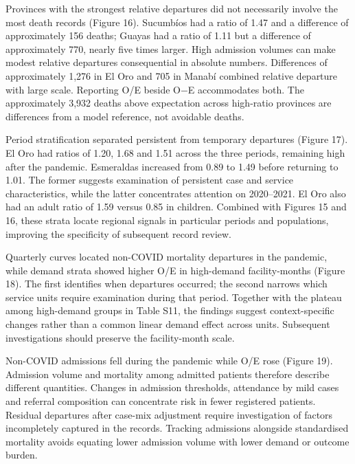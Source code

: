 \documentclass[11pt,a4paper]{article}
\newcommand{\subheading}[1]{\par\needspace{3\baselineskip}\vspace{5pt}{\bfseries #1}\par\vspace{1pt}}
\begin{document}
\subheading{Figure 16. Observed minus expected in-hospital deaths by province, 2015–2023.}
Provinces with the strongest relative departures did not necessarily involve the most death records (Figure 16). Sucumbíos had a ratio of 1.47 and a difference of approximately 156 deaths; Guayas had a ratio of 1.11 but a difference of approximately 770, nearly five times larger. High admission volumes can make modest relative departures consequential in absolute numbers. Differences of approximately 1,276 in El Oro and 705 in Manabí combined relative departure with large scale. Reporting O/E beside O$-$E accommodates both. The approximately 3,932 deaths above expectation across high-ratio provinces are differences from a model reference, not avoidable deaths.

\subheading{Figure 17. Standardised mortality ratios by province, period and age stratum.}
Period stratification separated persistent from temporary departures (Figure 17). El Oro had ratios of 1.20, 1.68 and 1.51 across the three periods, remaining high after the pandemic. Esmeraldas increased from 0.89 to 1.49 before returning to 1.01. The former suggests examination of persistent case and service characteristics, while the latter concentrates attention on 2020–2021. El Oro also had an adult ratio of 1.59 versus 0.85 in children. Combined with Figures 15 and 16, these strata locate regional signals in particular periods and populations, improving the specificity of subsequent record review.

\subheading{Figure 18. Quarterly non-COVID ARI mortality O/E (left) and facility COVID-19 demand strata (right), with March 2020–December 2021 shaded.}
Quarterly curves located non-COVID mortality departures in the pandemic, while demand strata showed higher O/E in high-demand facility-months (Figure 18). The first identifies when departures occurred; the second narrows which service units require examination during that period. Together with the plateau among high-demand groups in Table S11, the findings suggest context-specific changes rather than a common linear demand effect across units. Subsequent investigations should preserve the facility-month scale.

\subheading{Figure 19. Monthly (A) COVID-19 admissions, (B) non-COVID ARI admissions and (C) observed-to-expected mortality among non-COVID admissions.}
Non-COVID admissions fell during the pandemic while O/E rose (Figure 19). Admission volume and mortality among admitted patients therefore describe different quantities. Changes in admission thresholds, attendance by mild cases and referral composition can concentrate risk in fewer registered patients. Residual departures after case-mix adjustment require investigation of factors incompletely captured in the records. Tracking admissions alongside standardised mortality avoids equating lower admission volume with lower demand or outcome burden.
\end{document}
